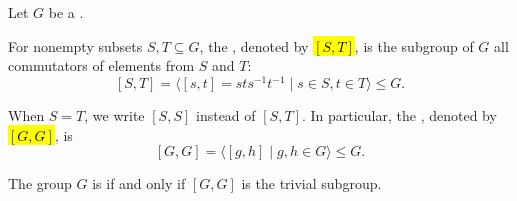 \begin{definition} \label{definition:commutator_of_two_subsets_of_a_group}
   Let $G$ be a . 

   For nonempty subsets $S, T \subseteq G$, the , denoted by \hl{$[S,T]$}, is the subgroup of $G$  all commutators of elements from $S$ and $T$:
   $$[S,T] = \langle [s,t] = sts^{-1}t^{-1} \mid s \in S, t \in T \rangle \leq G.$$

   When $S = T$, we write $[S,S]$ instead of $[S,T]$. In particular, the , denoted by \hl{$[G,G]$}, is
   $$[G,G] = \langle [g,h] \mid g,h \in G \rangle \leq G.$$

   The group $G$ is  if and only if $[G,G]$ is the trivial subgroup.
\end{definition}